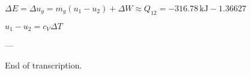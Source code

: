 \( \Delta E = \Delta u_g = m_g (u_1 - u_2) + \Delta W \approx Q_{12} = -316.78 \, \text{kJ} - 1.36627 \)  

\( u_1 - u_2 = c_V \Delta T \)  

---

End of transcription.